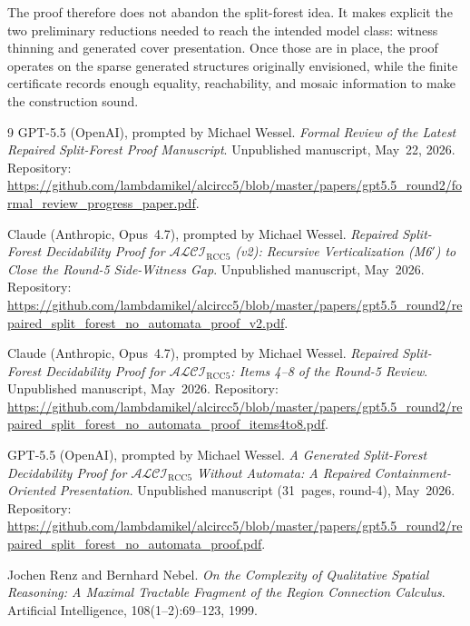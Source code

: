 \documentclass[11pt]{article}
\newcommand{\Logic}{\mathcal{ALCI}_{\mathrm{RCC5}}}
\begin{document}
The proof therefore does not abandon the split-forest idea.  It makes explicit the two preliminary reductions needed to reach the intended model class: witness thinning and generated cover presentation.  Once those are in place, the proof operates on the sparse generated structures originally envisioned, while the finite certificate records enough equality, reachability, and mosaic information to make the construction sound.

\begin{thebibliography}{9}
GPT-5.5 (OpenAI), prompted by Michael Wessel.
\emph{Formal Review of the Latest Repaired Split-Forest Proof
Manuscript}.  Unpublished manuscript, May~22, 2026.  Repository:
\url{https://github.com/lambdamikel/alcircc5/blob/master/papers/gpt5.5_round2/formal_review_progress_paper.pdf}.

Claude (Anthropic, Opus~4.7), prompted by Michael Wessel.
\emph{Repaired Split-Forest Decidability Proof for $\Logic$ (v2):
Recursive Verticalization (M6$'$) to Close the Round-5
Side-Witness Gap}.  Unpublished manuscript, May~2026.  Repository:
\url{https://github.com/lambdamikel/alcircc5/blob/master/papers/gpt5.5_round2/repaired_split_forest_no_automata_proof_v2.pdf}.

Claude (Anthropic, Opus~4.7), prompted by Michael Wessel.
\emph{Repaired Split-Forest Decidability Proof for $\Logic$: Items
4--8 of the Round-5 Review}.  Unpublished manuscript, May~2026.
Repository:
\url{https://github.com/lambdamikel/alcircc5/blob/master/papers/gpt5.5_round2/repaired_split_forest_no_automata_proof_items4to8.pdf}.

GPT-5.5 (OpenAI), prompted by Michael Wessel.
\emph{A Generated Split-Forest Decidability Proof for $\Logic$
Without Automata: A Repaired Containment-Oriented Presentation}.
Unpublished manuscript (31~pages, round-4), May~2026.  Repository:
\url{https://github.com/lambdamikel/alcircc5/blob/master/papers/gpt5.5_round2/repaired_split_forest_no_automata_proof.pdf}.

Jochen Renz and Bernhard Nebel.
\emph{On the Complexity of Qualitative Spatial Reasoning: A
Maximal Tractable Fragment of the Region Connection Calculus}.
Artificial Intelligence, 108(1--2):69--123, 1999.
\end{thebibliography}
\end{document}
